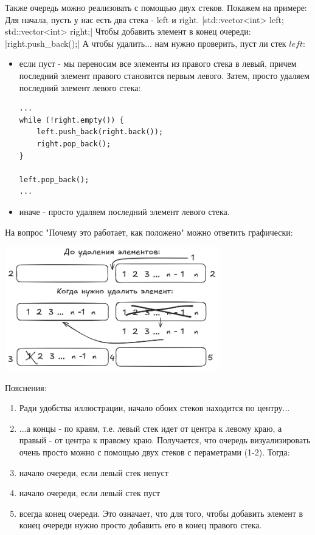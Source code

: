 \documentclass[a4paper,12pt]{article}
\begin{document}
\begin{itemize}
	      Также очередь можно реализовать с помощью двух стеков. Покажем на примере:
	      Для начала, пусть у нас есть два стека - left и right.
	      |std::vector<int> left; std::vector<int> right;|
	      Чтобы добавить элемент в конец очереди:
	      |right.push_back();|
	      А чтобы удалить... нам нужно проверить, пуст ли стек $left$:
	      \begin{itemize}
		      \item если пуст - мы переносим все элементы из правого стека в левый, причем последний
		            элемент правого становится первым левого. Затем, просто удаляем последний элемент
		            левого стека:
		            \begin{verbatim}
...
while (!right.empty()) {
    left.push_back(right.back());
    right.pop_back();
}

left.pop_back();
...
\end{verbatim}
		      \item иначе - просто удаляем последний элемент левого стека.
	      \end{itemize}

	      На вопрос "Почему это работает, как положено" можно ответить графически:

	      \begin{center}
		      \includegraphics[width=0.7\textwidth]{../assets/queue with 2 stacks.png}
	      \end{center}

	      Пояснения:
	      \begin{enumerate}
		      \item Ради удобства иллюстрации, начало обоих стеков находится по центру...
		      \item ...а концы - по краям, т.е. левый стек идет от центра к левому краю, а правый -
		            от центра к правому краю.
		            Получается, что очередь визуализировать очень просто можно с помощью
		            двух стеков с пераметрами (1-2). Тогда:
		      \item начало очереди, если левый стек непуст
		      \item начало очереди, если левый стек пуст
		      \item всегда конец очереди. Это означает, что для того, чтобы добавить элемент в конец
		            очереди нужно просто добавить его в конец правого стека.
	      \end{enumerate}


\end{itemize}
\end{document}
